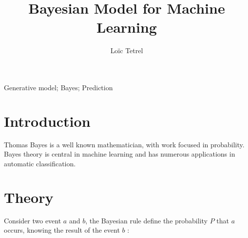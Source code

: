 \documentclass[runningheads,a4paper]{llncs}
\newcommand{\keywords}[1]{\par\addvspace\baselineskip
	\noindent\keywordname\enspace\ignorespaces#1}
\begin{document}
	
	\mainmatter  %
	
	\title{Bayesian Model for Machine Learning}
	
	
	\author{Loïc Tetrel}
	
	\institute{}
	
	
	
	\maketitle

	\keywords{Generative model; Bayes; Prediction}

	\section{Introduction}\label{introduction}
	Thomas Bayes is a well known mathematician, with work focused in probability. Bayes theory\cite{bayes1958essay} is central in machine learning and has numerous applications in automatic classification.
	
	\section{Theory}\label{theory}
	Consider two event $a$ and $b$, the Bayesian rule define the probability $P$ that $a$ occurs, knowing the result of the event $b$ :
	
\end{document}
